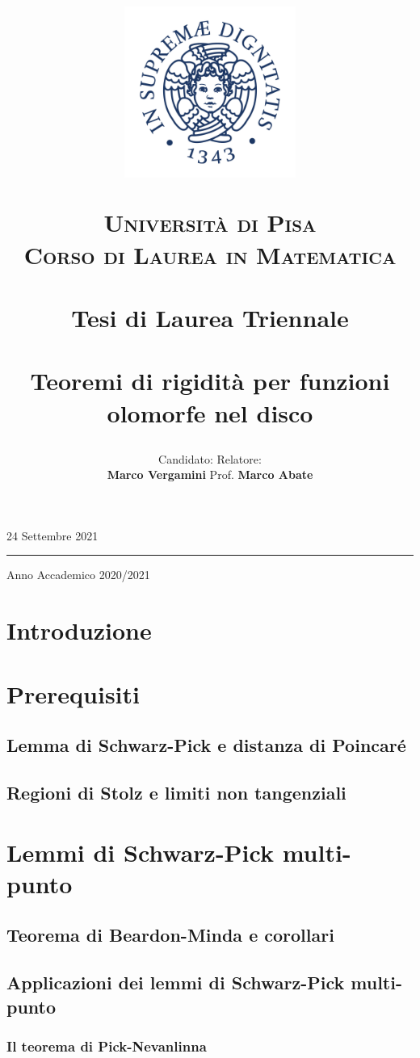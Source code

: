 \documentclass{article}
\title{\begin{figure}[t!]
  \centering
  \includegraphics[trim=0 55 0 60, clip, width=0.5\textwidth]{Stemma_unipi.jpg}
\end{figure}
\vspace{-17.5mm}
\textsc{\Large Università di Pisa}\\
\textsc{\large Corso di Laurea in Matematica}\\
\, \\
{\large Tesi di Laurea Triennale}\\
\, \\
Teoremi di rigidità per funzioni olomorfe nel disco}
\author{Candidato:  \hspace{200px} Relatore:\\
\textbf{Marco Vergamini} \hfill Prof. \textbf{Marco Abate}}
\date{}
\begin{document}
\maketitle
\vspace*{\fill}
\begin{center}
  24 Settembre 2021
  \par\noindent\rule{\textwidth}{0.5pt}
  \Large Anno Accademico 2020/2021
\end{center}
\newpage
\tableofcontents
\newpage


\section*{Introduzione}


\newpage

\section{Prerequisiti}

\subsection{Lemma di Schwarz-Pick e distanza di Poincaré}


\subsection{Regioni di Stolz e limiti non tangenziali}


\newpage

\section{Lemmi di Schwarz-Pick multi-punto}

\subsection{Teorema di Beardon-Minda e corollari}


\subsection{Applicazioni dei lemmi di Schwarz-Pick multi-punto}


\subsubsection{Il teorema di Pick-Nevanlinna}

\end{document}
